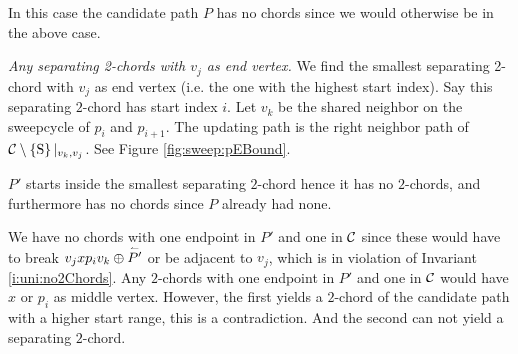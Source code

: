     In this case the candidate path $P$ has no chords since we would otherwise be in the above case.

    \emph{Any separating 2-chords with $v_j$ as end vertex.}
      We find the smallest separating 2-chord with $v_j$ as end vertex (i.e. the one with the highest start index). Say this separating $2$-chord has start index $i$.
      Let $v_k$ be the shared neighbor on the sweepcycle of $p_{i}$ and $p_{i +1}$. The updating path is the right neighbor path of $\mathcal{C} \setminus \left\lbrace {\mathrm{S}} \right\rbrace|_{v_k, v_j}$. See Figure \ref{fig:sweep:pEBound}.

      $P'$ starts inside the smallest separating $2$-chord hence it has no $2$-chords, and furthermore has no chords since $P$ already had none.

      We have no chords with one endpoint in $P'$ and one in $\mathcal{C}$ since these would have to break $v_j x p_i v_k \oplus \accentset{\leftharpoonup}{P'}$ or be adjacent to $v_j$, which is in violation of Invariant \ref{i:uni:no2Chords}.
      Any $2$-chords with one endpoint in $P'$ and one in $\mathcal{C}$ would have $x$ or $p_i$ as middle vertex.
      However, the first yields a $2$-chord of the candidate path with a higher start range, this is a contradiction.
      And the second can not yield a separating $2$-chord. 

